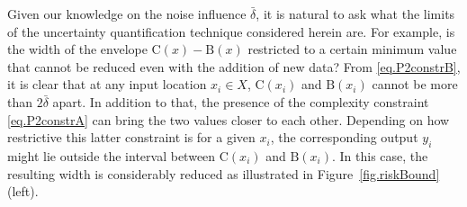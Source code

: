 Given our knowledge on the noise influence $\bar \delta$, it is natural to ask what the limits of the uncertainty quantification technique considered herein are. For example, is the width of the envelope $\text{C}(x) - \text{B}(x)$ restricted to a certain minimum value that cannot be reduced even with the addition of new data? From \eqref{eq.P2constrB}, it is clear that at any input location $x_i \in X$, $\text{C}(x_i)$ and $\text{B}(x_i)$ cannot be more than $2\bar \delta$ apart. In addition to that, the presence of the complexity constraint \eqref{eq.P2constrA} can bring the two values closer to each other. Depending on how restrictive this latter constraint is for a given $x_i$, the corresponding output $y_i$ might lie outside the interval between $\text{C}(x_i)$ and $\text{B}(x_i)$. In this case, the resulting width is considerably reduced as illustrated in Figure~\ref{fig.riskBound} (left).

